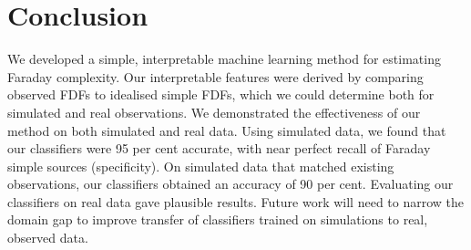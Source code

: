 \section{Conclusion}
\label{sec:faraday-conclusion}

  We developed a simple, interpretable machine learning method for estimating Faraday complexity. Our interpretable features were derived by comparing observed FDFs to idealised simple FDFs, which we could determine both for simulated and real observations. We demonstrated the effectiveness of our method on both simulated and real data. Using simulated data, we found that our classifiers were 95 per cent accurate, with near perfect recall of Faraday simple sources (specificity). On simulated data that matched existing observations, our classifiers obtained an accuracy of 90 per cent. Evaluating our classifiers on real data gave plausible results. Future work will need to narrow the domain gap to improve transfer of classifiers trained on simulations to real, observed data.





\appendix

